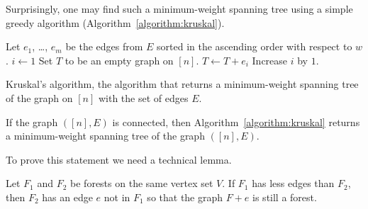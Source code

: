 Surprisingly, one may find such a minimum-weight spanning tree using a simple
greedy algorithm (Algorithm~\ref{algorithm:kruskal}).
\begin{algorithm}
  \begin{algorithmic}[1]
      \State Let $e_1$, \dots, $e_m$ be the edges from $E$ sorted in the
        ascending order with respect to $w$.
      \State $i \gets 1$
      \State Set $T$ to be an empty graph on $[n]$.
      \label{line:kruskal-while}
          \State $T \gets T + e_i$
        \EndIf
        \State Increase $i$ by $1$.
      \EndWhile
      \State {}
    \EndFunction
  \end{algorithmic}
  \caption{Kruskal's algorithm, the algorithm that returns a minimum-weight
  spanning tree of the graph on $[n]$ with the set of edges $E$.}
  \label{algorithm:kruskal}
\end{algorithm}

\begin{theorem}
\label{theorem:kruskal}
  If the graph $([n], E)$ is connected, then Algorithm~\ref{algorithm:kruskal}
  returns a minimum-weight spanning tree of the graph $([n], E)$.
\end{theorem}

To prove this statement we need a technical lemma.
\begin{lemma}
  Let $F_1$ and $F_2$ be forests on the same vertex set $V$. If $F_1$ has less
  edges than $F_2$, then $F_2$ has an edge $e$ not in $F_1$ so
  that the graph $F + e$ is still a forest.
\end{lemma}

